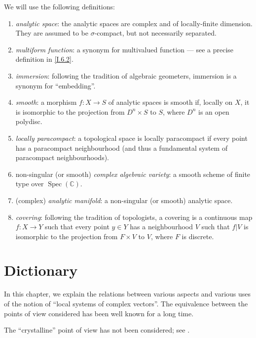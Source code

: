 \documentclass{report}
\theoremstyle{plain}
\theoremstyle{definition}
\DeclareMathOperator{\Spec}{Spec}
\newcommand{\oldpage}[1]{\marginpar{\footnotesize$\Big\vert$ \textit{p.~#1}}}
\begin{document}
We will use the following definitions:
\begin{enumerate}[({0.}1)]
  \item\label{0.1}
    \emph{analytic space}:
    the analytic spaces are complex and of locally-finite dimension.
    They are assumed to be $\sigma$-compact, but not necessarily separated.
  \item\label{0.2}
    \emph{multiform function}:
    a synonym for multivalued function --- see a precise definition in \cref{I.6.2}.
  \item\label{0.3}
    \emph{immersion}:
    following the tradition of algebraic geometers, immersion is a synonym for ``embedding''.
  \item\label{0.4}
    \emph{smooth}:
    a morphism $f\colon X\to S$ of analytic spaces is smooth if, locally on $X$, it is isomorphic to the projection from $D^n\times S$ to $S$, where $D^n$ is an open polydisc.
  \item\label{0.5}
    \emph{locally paracompact}:
    a topological space is locally paracompact if every point has a paracompact neighbourhood (and thus a fundamental system of paracompact neighbourhoods).
  \item\label{0.6}
    non-singular (or smooth) \emph{complex algebraic variety}:
    a smooth scheme of finite type over $\Spec(\mathbb{C})$.
  \item\label{0.7}
    (complex) \emph{analytic manifold}:
    a non-singular (or smooth) analytic space.
  \item\label{0.8}
    \emph{covering}:
    following the tradition of topologists, a covering is a continuous map $f\colon X\to Y$ such that every point $y\in Y$ has a neighbourhood $V$ such that $f|V$ is isomorphic to the projection from $F\times V$ to $V$, where $F$ is discrete.
\end{enumerate}


\renewcommand{\thechapter}{\Roman{chapter}}

\chapter{Dictionary}
\label{I}

\oldpage{3}
In this chapter, we explain the relations between various aspects and various uses of the notion of ``local systems of complex vectors''.
The equivalence between the points of view considered has been well known for a long time.

The ``crystalline'' point of view has not been considered;
see \cite{4,10}.
\end{document}
